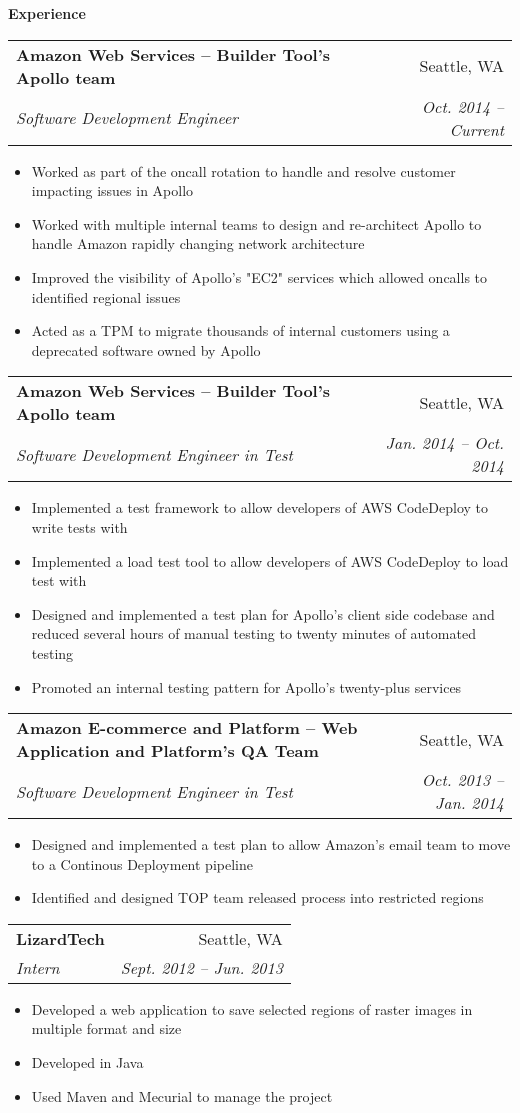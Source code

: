 \documentclass[letterpaper,11pt]{article}
\makeatletter
\newcommand{\resitem}[1]{\item #1 \vspace{-2pt}}
\newcommand{\resheading}[1]{{\large \colorbox{mygrey}{\begin{minipage}{\textwidth}{\textbf{#1 \vphantom{p\^{E}}}}\end{minipage}}}}
\newcommand{\ressubheading}[4]{
\begin{tabular*}{6.5in}{l@{\extracolsep{\fill}}r}
		\textbf{#1} & #2 \\
		\textit{#3} & \textit{#4} \\
\end{tabular*}\vspace{-6pt}}
\makeatother
\begin{document}
\resheading{Experience}
	\begin{description}
		 {\footnotesize 
			\item \ressubheading{{Amazon Web Services -- Builder Tool's Apollo team }}{Seattle, WA}{Software Development Engineer}{Oct. 2014 -- Current}
				\begin{itemize}
					\resitem{Worked as part of the oncall rotation to handle and resolve customer impacting issues in Apollo}
					\resitem{Worked with multiple internal teams to design and re-architect Apollo to handle Amazon rapidly changing network architecture  }					
					\resitem{Improved the visibility of Apollo's "EC2" services which allowed oncalls to identified regional issues }
					\resitem{Acted as a TPM to migrate thousands of internal customers using a deprecated software owned by Apollo }
				\end{itemize}
			\item \ressubheading{{Amazon Web Services -- Builder Tool's Apollo team }}{Seattle, WA}{Software Development Engineer in Test}{Jan. 2014 -- Oct. 2014}
				\begin{itemize}
					\resitem{Implemented a test framework to allow developers of AWS CodeDeploy to write tests with}
					\resitem{Implemented a load test tool to allow developers of AWS CodeDeploy to load test with}
					\resitem{Designed and implemented a test plan for Apollo's client side codebase and reduced several hours of manual testing to twenty minutes of automated testing}
					\resitem{Promoted an internal testing pattern for Apollo's twenty-plus services}
				\end{itemize}
			\item \ressubheading{{Amazon E-commerce and Platform -- Web Application and Platform's QA Team}}{Seattle, WA}{Software Development Engineer in Test}{Oct. 2013 -- Jan. 2014}
				\begin{itemize}
					\resitem{Designed and implemented a test plan to allow Amazon's email team to move to a Continous Deployment pipeline }
					\resitem{Identified and designed TOP team released process into restricted regions}
				\end{itemize}
			\item \ressubheading{{LizardTech }}{Seattle, WA}{Intern}{Sept. 2012 -- Jun. 2013}
				\begin{itemize}
					\resitem{Developed a web application to save selected regions of raster images in multiple format and size}
					\resitem{Developed in Java}
					\resitem{Used Maven and Mecurial to manage the project}
				\end{itemize}
			}



	\end{description} %
	
\end{document}
